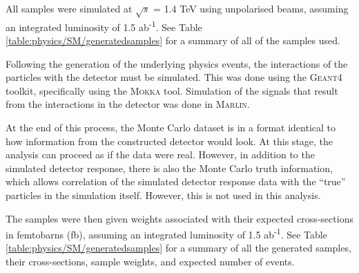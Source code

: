 All samples were simulated at $\sqrt{s}$ = 1.4 TeV using unpolarised beams, assuming an integrated luminosity of 1.5 ab\textsuperscript{-1}. See Table \ref{table:physics/SM/generatedsamples} for a summary of all of the samples used. 

Following the generation of the underlying physics events, the interactions of the particles with the detector must be simulated. This was done using the \textsc{Geant4} toolkit\cite{geant4}, specifically using the \textsc{Mokka} tool. Simulation of the signals that result from the interactions in the detector was done in \textsc{Marlin}\cite{marlin}.

At the end of this process, the Monte Carlo dataset is in a format identical to how information from the constructed detector would look. At this stage, the analysis can proceed as if the data were real. However, in addition to the simulated detector response, there is also the Monte Carlo truth information, which allows correlation of the simulated detector response data with the ``true'' particles in the simulation itself. However, this is not used in this analysis.

The samples were then given weights associated with their expected cross-sections in femtobarns (fb), assuming an integrated luminosity of 1.5 ab\textsuperscript{-1}. See Table \ref{table:physics/SM/generatedsamples} for a summary of all the generated samples, their cross-sections, sample weights, and expected number of events. \\

